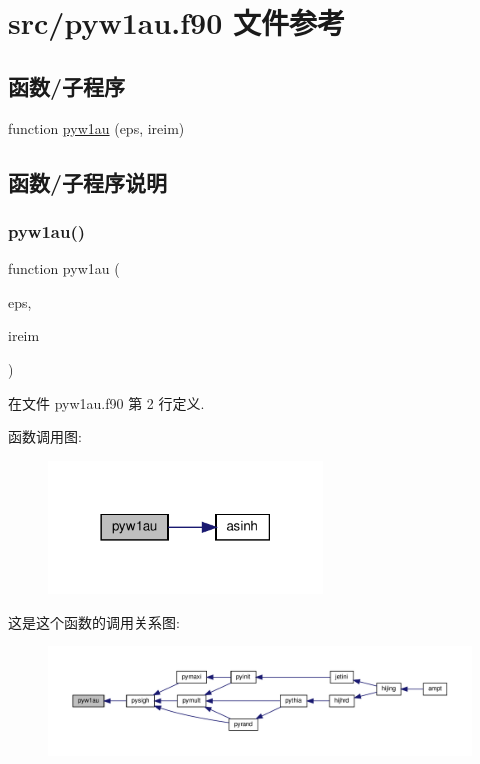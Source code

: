 \hypertarget{pyw1au_8f90}{}\section{src/pyw1au.f90 文件参考}
\label{pyw1au_8f90}
\subsection*{函数/子程序}
\begin{DoxyCompactItemize}
\item 
function \mbox{\hyperlink{pyw1au_8f90_a2c3a62daea59b4ada998c331b37e3634}{pyw1au}} (eps, ireim)
\end{DoxyCompactItemize}


\subsection{函数/子程序说明}
\mbox{\label{pyw1au_8f90_a2c3a62daea59b4ada998c331b37e3634}} 
\subsubsection{\texorpdfstring{pyw1au()}{pyw1au()}}
{\footnotesize\ttfamily function pyw1au (\begin{DoxyParamCaption}\item[{}]{eps,  }\item[{}]{ireim }\end{DoxyParamCaption})}



在文件 pyw1au.\+f90 第 2 行定义.

函数调用图\+:
\nopagebreak
\begin{figure}[H]
\begin{center}
\leavevmode
\includegraphics[width=206pt]{pyw1au_8f90_a2c3a62daea59b4ada998c331b37e3634_cgraph}
\end{center}
\end{figure}
这是这个函数的调用关系图\+:
\nopagebreak
\begin{figure}[H]
\begin{center}
\leavevmode
\includegraphics[width=350pt]{pyw1au_8f90_a2c3a62daea59b4ada998c331b37e3634_icgraph}
\end{center}
\end{figure}
